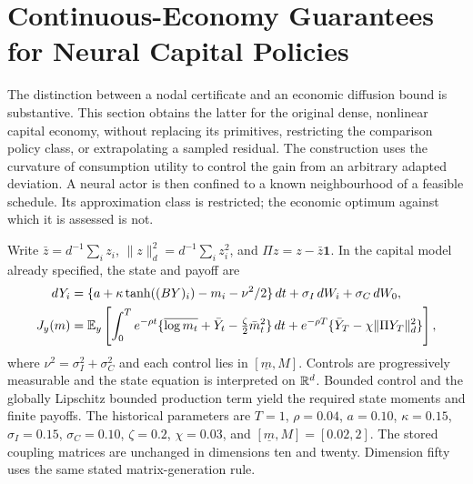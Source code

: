 \section{Continuous-Economy Guarantees for Neural Capital Policies}\label{sec:r10continuous}
The distinction between a nodal certificate and an economic diffusion bound is substantive. This section obtains the latter for the original dense, nonlinear capital economy, without replacing its primitives, restricting the comparison policy class, or extrapolating a sampled residual. The construction uses the curvature of consumption utility to control the gain from an arbitrary adapted deviation. A neural actor is then confined to a known neighbourhood of a feasible schedule. Its approximation class is restricted; the economic optimum against which it is assessed is not.

Write $\bar z=d^{-1}\sum_i z_i$, $\|z\|_d^2=d^{-1}\sum_i z_i^2$, and $\Pi z=z-\bar z\bm1$. In the capital model already specified, the state and payoff are
\begin{align}
 dY_i&=\{a+\kappa\tanh((BY)_i)-m_i-\nu^2/2\}\,dt
       +\sigma_I\,dW_i+\sigma_C\,dW_0,\label{eq:r10state}\\
 J_y(m)&=\mathbb E_y\left[\int_0^T e^{-\rho t}
  \{\overline{\log m_t}+\bar Y_t-\tfrac\zeta2\bar m_t^2\}\,dt
  +e^{-\rho T}\{\bar Y_T-\chi\|\Pi Y_T\|_d^2\}\right],\label{eq:r10payoff}
\end{align}
where $\nu^2=\sigma_I^2+\sigma_C^2$ and each control lies in $[\underline m,M]$. Controls are progressively measurable and the state equation is interpreted on $\mathbb R^d$. Bounded control and the globally Lipschitz bounded production term yield the required state moments and finite payoffs. The historical parameters are $T=1$, $\rho=0.04$, $a=0.10$, $\kappa=0.15$, $\sigma_I=0.15$, $\sigma_C=0.10$, $\zeta=0.2$, $\chi=0.03$, and $[\underline m,M]=[0.02,2]$. The stored coupling matrices are unchanged in dimensions ten and twenty. Dimension fifty uses the same stated matrix-generation rule.

